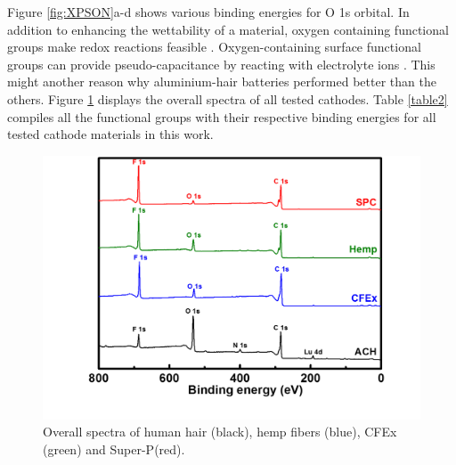 \documentclass{article}
\begin{document}
Figure \ref{fig:XPSON}a-d shows various binding energies for O 1s orbital. In addition to enhancing the wettability of a material, oxygen containing functional groups make redox reactions feasible \cite{li_effect_2011, oh_oxygen_2014}. Oxygen-containing surface functional groups can provide pseudo-capacitance by reacting with electrolyte ions \cite{bleda-martinez_role_2005}. This might another reason why aluminium-hair batteries performed better than the others. Figure \ref{fig:XPSoverall} displays the overall spectra of all tested cathodes. Table \ref{table2} compiles all the functional groups with their respective binding energies for all tested cathode materials in this work. 

\begin{figure}[th!]
\centering
\includegraphics[width=\textwidth]{fig/XPSoverall}
\caption{Overall spectra of human hair (black), hemp fibers (blue), CFEx (green) and Super-P(red).}
\label{fig:XPSoverall}
\end{figure}
\end{document}
